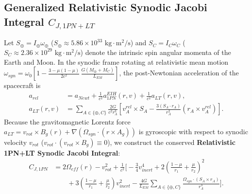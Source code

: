 \documentclass[11pt,a4paper,reqno]{article}
\def\bm#1{#1}%
\def\mathrm#1{#1}%
\def\mathbb#1{#1}%
\theoremstyle{plain}
\theoremstyle{definition}
\theoremstyle{remark}
\numberwithin{equation}{section}
\begin{document}
\subsection{Generalized Relativistic Synodic Jacobi Integral \texorpdfstring{$C_{J,\mathrm{1PN+LT}}$}{C\_J,1PN+LT}}
Let $\bm{S}_\oplus = I_\oplus \bm{\omega}_\oplus$ ($S_\oplus \approx 5.86 \times 10^{33}\text{ kg}\cdot\text{m}^2/\text{s}$) and $\bm{S}_{\mathbb{C}} = I_{\mathbb{C}} \bm{\omega}_{\mathbb{C}}$ ($S_{\mathbb{C}} \approx 2.36 \times 10^{29}\text{ kg}\cdot\text{m}^2/\text{s}$) denote the intrinsic spin angular momenta of the Earth and Moon. In the synodic frame rotating at relativistic mean motion $\omega_{\mathrm{syn}} = \omega_0\!\left[1 - \frac{3 - \mu(1-\mu)}{2c^2}\,\frac{G(M_\oplus+M_{\mathbb{C}})}{L_{\mathrm{EM}}}\right]$, the post-Newtonian acceleration of the spacecraft is
\begin{align}
  \bm{a}_{\mathrm{rel}} &= \bm{a}_{\mathrm{Newt}} + \frac{1}{c^2}\bm{a}_{\mathrm{1PN}}^{\mathrm{EIH}}(\bm{r}, \bm{v}) + \frac{1}{c^2}\bm{a}_{\mathrm{LT}}(\bm{r}, \bm{v}), \label{eq:cislunar_1pn_total_accel} \\
  \bm{a}_{\mathrm{LT}}(\bm{r}, \bm{v}) &= \sum_{A \in \{\oplus, \mathbb{C}\}} \frac{2 G}{c^2 r_A^3}\left[ \bm{v}_A^{\mathrm{rel}} \times \bm{S}_A - \frac{3(\bm{S}_A \cdot \bm{r}_A)}{r_A^2}\left(\bm{r}_A \times \bm{v}_A^{\mathrm{rel}}\right) \right]. \label{eq:cislunar_lense_thirring_accel}
\end{align}
Because the gravitomagnetic Lorentz force $\bm{a}_{\mathrm{LT}} = \bm{v}_{\mathrm{rot}} \times \bm{B}_g(\bm{r}) + \nabla(\bm{\Omega}_{\mathrm{syn}} \cdot (\bm{r} \times \bm{A}_g))$ is gyroscopic with respect to synodic velocity $\bm{v}_{\mathrm{rot}}$ ($\bm{v}_{\mathrm{rot}} \cdot (\bm{v}_{\mathrm{rot}} \times \bm{B}_g) \equiv 0$), we construct the conserved \textbf{Relativistic 1PN+LT Synodic Jacobi Integral}:
\begin{align}
  C_{J,\mathrm{1PN}} &= 2\Omega_{\mathrm{eff}}(\bm{r}) - v_{\mathrm{rot}}^2 + \frac{1}{c^2}\Biggl[ -\frac{3}{4}v_{\mathrm{inert}}^4 + 2\left(\frac{1-\mu}{r_1} + \frac{\mu}{r_2}\right)^2 \nonumber\\
  &\qquad + 3\left(\frac{1-\mu}{r_1} + \frac{\mu}{r_2}\right)v_{\mathrm{inert}}^2 - \frac{4G}{L_{\mathrm{EM}}}\sum_{A \in \{\oplus,\mathbb{C}\}}\frac{\bm{\Omega}_{\mathrm{syn}} \cdot (\bm{S}_A \times \bm{r}_A)}{r_A^3} \Biggr].
  \label{eq:relativistic_jacobi_1pn}
\end{align}
\end{document}
